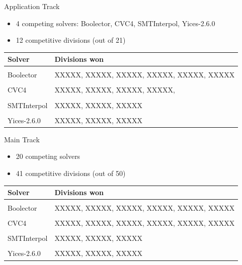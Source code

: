 \documentclass{beamer}
\begin{document}
\begin{frame}{Application Track}
  \begin{itemize}
  \item 4 competing solvers: Boolector, CVC4, SMTInterpol, Yices-2.6.0
  \item 12 competitive divisions (out of 21)
  \end{itemize}

  \bigskip\pause

  \begin{center}
    \begin{tabular}{lp{}}
    Solver      & Divisions won \\ \hline \\[-1.5ex]
    Boolector   & XXXXX, XXXXX, XXXXX, XXXXX, XXXXX, XXXXX \\
    \\[-1.5ex]
    CVC4        & XXXXX, XXXXX, XXXXX, XXXXX, \\
    \\[-1.5ex]
    SMTInterpol & XXXXX, XXXXX, XXXXX \\
    \\[-1.5ex]
    Yices-2.6.0 & XXXXX, XXXXX, XXXXX
    \end{tabular}
  \end{center}
\end{frame}


\begin{frame}{Main Track}
  \begin{itemize}
  \item 20 competing solvers
  \item 41 competitive divisions (out of 50)
  \end{itemize}

  \bigskip\pause

  \begin{center}
    \begin{tabular}{lp{}}
      Solver      & Divisions won \\ \hline \\[-1.5ex]
      Boolector   & XXXXX, XXXXX, XXXXX, XXXXX, XXXXX, XXXXX \\
      \\[-1.5ex]
      CVC4        & XXXXX, XXXXX, XXXXX, XXXXX, XXXXX, XXXXX \\
      \\[-1.5ex]
      SMTInterpol & XXXXX, XXXXX, XXXXX \\
      \\[-1.5ex]
      Yices-2.6.0 & XXXXX, XXXXX, XXXXX
    \end{tabular}
  \end{center}
\end{frame}
\end{document}
